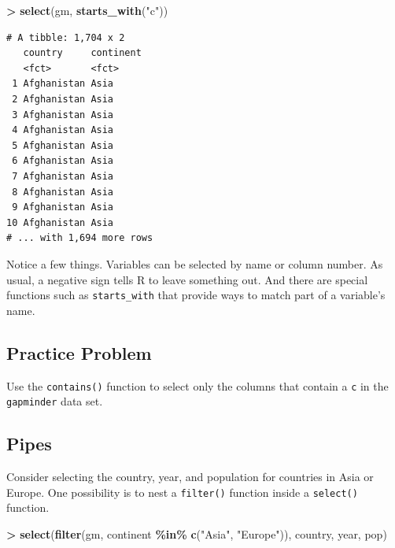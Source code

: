 \documentclass[
]{krantz}
\makeatletter
\newenvironment{Shaded}{\begin{snugshade}}{\end{snugshade}}
\newcommand{\KeywordTok}[1]{\textcolor[rgb]{0.27,0.27,0.27}{\textbf{#1}}}
\newcommand{\NormalTok}[1]{#1}
\newcommand{\OperatorTok}[1]{\textcolor[rgb]{0.43,0.43,0.43}{\textbf{#1}}}
\newcommand{\StringTok}[1]{\textcolor[rgb]{0.5,0.5,0.5}{#1}}
\newenvironment{kframe}{%
\medskip{}
\setlength{\fboxsep}{.8em}
 \def\at@end@of@kframe{}%
 \ifinner\ifhmode%
  \def\at@end@of@kframe{\end{minipage}}%
  \begin{minipage}{\columnwidth}%
 \fi\fi%
 \def\FrameCommand##1{\hskip\@totalleftmargin \hskip-\fboxsep
 \colorbox{shadecolor}{##1}\hskip-\fboxsep
     \hskip-\linewidth \hskip-\@totalleftmargin \hskip\columnwidth}%
 \MakeFramed {\advance\hsize-\width
   \@totalleftmargin\z@ \linewidth\hsize
   \@setminipage}}%
 {\par\unskip\endMakeFramed%
 \at@end@of@kframe}
\renewenvironment{Shaded}{\begin{kframe}}{\end{kframe}}
\makeatother
\begin{document}
\begin{Shaded}
\begin{Highlighting}[]
\OperatorTok{\textgreater{}}\StringTok{ }\KeywordTok{select}\NormalTok{(gm, }\KeywordTok{starts\_with}\NormalTok{(}\StringTok{"c"}\NormalTok{))}
\end{Highlighting}
\end{Shaded}

\begin{verbatim}
# A tibble: 1,704 x 2
   country     continent
   <fct>       <fct>    
 1 Afghanistan Asia     
 2 Afghanistan Asia     
 3 Afghanistan Asia     
 4 Afghanistan Asia     
 5 Afghanistan Asia     
 6 Afghanistan Asia     
 7 Afghanistan Asia     
 8 Afghanistan Asia     
 9 Afghanistan Asia     
10 Afghanistan Asia     
# ... with 1,694 more rows
\end{verbatim}

Notice a few things. Variables can be selected by name or column number. As usual, a negative sign tells R to leave something out. And there are special functions such as \texttt{starts\_with} that provide ways to match part of a variable's name.

\hypertarget{practice-problem-8}{%
\subsection{Practice Problem}\label{practice-problem-8}}

Use the \texttt{contains()} function to select only the columns that contain a \texttt{c} in the \texttt{gapminder} data set.

\hypertarget{pipes}{%
\subsection{Pipes}\label{pipes}}

Consider selecting the country, year, and population for countries in Asia or Europe. One possibility is to nest a \texttt{filter()} function inside a \texttt{select()} function.

\begin{Shaded}
\begin{Highlighting}[]
\OperatorTok{\textgreater{}}\StringTok{ }\KeywordTok{select}\NormalTok{(}\KeywordTok{filter}\NormalTok{(gm, continent }\OperatorTok{\%in\%}\StringTok{ }\KeywordTok{c}\NormalTok{(}\StringTok{"Asia"}\NormalTok{, }\StringTok{"Europe"}\NormalTok{)), country, year, pop)}
\end{Highlighting}
\end{Shaded}
\end{document}
